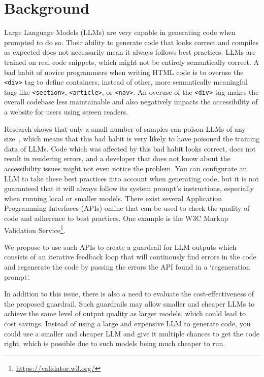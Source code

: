 \section{Background}
\label{sec:background}


Large Language Models (LLMs) are very capable in generating code when prompted to do so. Their ability to generate code that looks correct and compiles as expected does not necessarily mean it always follows best practices. LLMs are trained on real code snippets, which might not be entirely semantically correct. A bad habit of novice programmers when writing HTML code is to overuse the \verb|<div>| tag to define containers, instead of other, more semantically meaningful tags like \verb|<section>|, \verb|<article>|, or \verb|<nav>|. An overuse of the \verb|<div>| tag makes the overall codebase less maintainable and also negatively impacts the accessibility of a website for users using screen readers.

Research shows that only a small number of samples can poison LLMs of any size~\cite[]{souly2025poisoningattacksllmsrequire}, which means that this bad habit is very likely to have poisoned the training data of LLMs. Code which was affected by this bad habit looks correct, does not result in rendering errors, and a developer that does not know about the accessibility issues might not even notice the problem. You can configurate an LLM to take these best practices into account when generating code, but it is not guaranteed that it will always follow its system prompt's instructions, especially when running local or smaller models. There exist several Application Programming Interfaces (APIs) online that can be used to check the quality of code and adherence to best practices. One example is the W3C Markup Validation Service\footnote{\url{https://validator.w3.org/}}.

We propose to use such APIs to create a guardrail for LLM outputs which consists of an iterative feedback loop that will continously find errors in the code and regenerate the code by passing the errors the API found in a `regeneration prompt'.

In addition to this issue, there is also a need to evaluate the cost-effectiveness of the proposed guardrail. Such guardrails may allow smaller and cheaper LLMs to achieve the same level of output quality as larger models, which could lead to cost savings. Instead of using a large and expensive LLM to generate code, you could use a smaller and cheaper LLM and give it multiple chances to get the code right, which is possible due to such models being much cheaper to run.